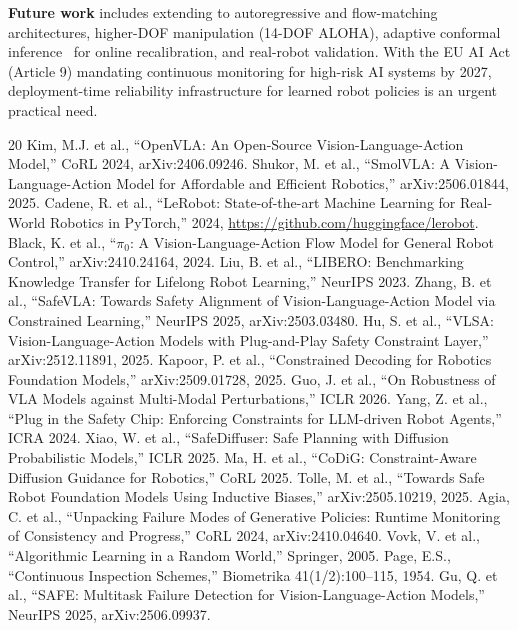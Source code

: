 \documentclass[conference]{IEEEtran}
\begin{document}
\textbf{Future work} includes extending to autoregressive and flow-matching architectures,
higher-DOF manipulation (14-DOF ALOHA),
adaptive conformal inference~\cite{gibbs2021} for online recalibration,
and real-robot validation.
With the EU AI Act (Article 9) mandating continuous monitoring for high-risk AI systems by 2027, deployment-time reliability infrastructure for learned robot policies is an urgent practical need.

\begin{thebibliography}{20}
 Kim, M.J. et al., ``OpenVLA: An Open-Source Vision-Language-Action Model,'' CoRL 2024, arXiv:2406.09246.
 Shukor, M. et al., ``SmolVLA: A Vision-Language-Action Model for Affordable and Efficient Robotics,'' arXiv:2506.01844, 2025.
 Cadene, R. et al., ``LeRobot: State-of-the-art Machine Learning for Real-World Robotics in PyTorch,'' 2024, \url{https://github.com/huggingface/lerobot}.
 Black, K. et al., ``$\pi_0$: A Vision-Language-Action Flow Model for General Robot Control,'' arXiv:2410.24164, 2024.
 Liu, B. et al., ``LIBERO: Benchmarking Knowledge Transfer for Lifelong Robot Learning,'' NeurIPS 2023.
 Zhang, B. et al., ``SafeVLA: Towards Safety Alignment of Vision-Language-Action Model via Constrained Learning,'' NeurIPS 2025, arXiv:2503.03480.
 Hu, S. et al., ``VLSA: Vision-Language-Action Models with Plug-and-Play Safety Constraint Layer,'' arXiv:2512.11891, 2025.
 Kapoor, P. et al., ``Constrained Decoding for Robotics Foundation Models,'' arXiv:2509.01728, 2025.
 Guo, J. et al., ``On Robustness of VLA Models against Multi-Modal Perturbations,'' ICLR 2026.
 Yang, Z. et al., ``Plug in the Safety Chip: Enforcing Constraints for LLM-driven Robot Agents,'' ICRA 2024.
 Xiao, W. et al., ``SafeDiffuser: Safe Planning with Diffusion Probabilistic Models,'' ICLR 2025.
 Ma, H. et al., ``CoDiG: Constraint-Aware Diffusion Guidance for Robotics,'' CoRL 2025.
 Tolle, M. et al., ``Towards Safe Robot Foundation Models Using Inductive Biases,'' arXiv:2505.10219, 2025.
 Agia, C. et al., ``Unpacking Failure Modes of Generative Policies: Runtime Monitoring of Consistency and Progress,'' CoRL 2024, arXiv:2410.04640.
 Vovk, V. et al., ``Algorithmic Learning in a Random World,'' Springer, 2005.
 Page, E.S., ``Continuous Inspection Schemes,'' Biometrika 41(1/2):100--115, 1954.
 Gu, Q. et al., ``SAFE: Multitask Failure Detection for Vision-Language-Action Models,'' NeurIPS 2025, arXiv:2506.09937.

\end{thebibliography}
\end{document}
